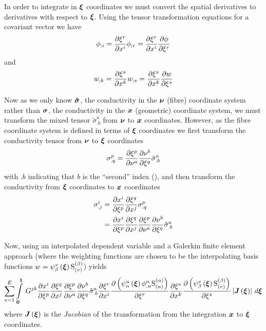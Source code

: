 In order to integrate in $\vect{\xi}$ coordinates we must convert the spatial
derivatives to derivatives with respect to $\vect{\xi}$. Using the tensor
transformation equations for a covariant vector we have
\begin{equation}  
   {\phi}_{;i} = \dfrac{\partial \xi^{r}}{\partial x^{i}}  {\phi}_{;r} = \dfrac{\partial \xi^{r}}{\partial x^{i}}  \dfrac{\partial \phi}{\partial \xi^{r}} 
\end{equation}
and 
\begin{equation}
   {w}_{;k} = \dfrac{\partial \xi^{s}}{\partial x^{k}}  {w}_{;s} = \dfrac{\partial \xi^{s}}{\partial x^{k}}  \dfrac{\partial w}{\partial \xi^{s}} 
\end{equation}

Now as we only know $\boldsymbol{\tilde{\sigma}}$, the conductivity in the
$\vect{\nu}$ (fibre) coordinate system rather than $\boldsymbol{\sigma}$, the
conductivity in the $\vect{x}$ (geometric) coordinate system, we must transform the mixed
tensor ${\tilde{\sigma}}^{a}_{.b}$ from $\vect{\nu}$ to $\vect{x}$ coordinates. However, as the
fibre coordinate system is defined in terms of $\vect{\xi}$ coordinates we
first transform the conductivity tensor from $\vect{\nu}$ to $\vect{\xi}$
coordinates \ie
\begin{equation}
  \sigma^{p}_{.q}= \dfrac{\partial \xi^{p}}{\partial \nu^{a}}  \dfrac{\partial \nu^{b}}{\partial \xi^{q}} {\tilde{\sigma}}^{a}_{.b}
\end{equation}
with $.b$ indicating that $b$ is the ``second'' index (),
and then transform the conductivity from $\vect{\xi}$ coordinates to
$\vect{x}$ coordinates \ie
\begin{equation}
  \begin{split}
    \sigma^{i}_{.j} &=  \dfrac{\partial x^{i}}{\partial \xi^{p}}  \dfrac{\partial \xi^{q}}{\partial x^{j}} {\sigma}^{p}_{.q} \\
    &=  \dfrac{\partial x^{i}}{\partial \xi^{p}}  \dfrac{\partial \xi^{q}}{\partial x^{j}}  \dfrac{\partial \xi^{p}}{\partial \nu^{a}}  \dfrac{\partial \nu^{b}}{\partial \xi^{q}} {\tilde{\sigma}}^{a}_{.b}
  \end{split}
\end{equation}

Now, using an interpolated dependent variable and a Galerkin finite element
approach (where the weighting functions are chosen to be the interpolating
basis functions \ie $w=\gbfn{\beta}{v}{\vect{\xi}}\gsf{(\beta)}{(v)}$) yields
\begin{equation}
  \dsum_{e=1}^{E}\gint{\vect{0}}{\vect{1}}{G^{jk}\delby{x^{i}}{\xi^{p}}
    \delby{\xi^{q}}{x^{j}}\delby{\xi^{p}} {\nu^{a}}
    \delby{\nu^{b}}{\xi^{q}}{\tilde{\sigma}}^{a}_{.b}\delby{\xi^{r}}{x^{i}}
    \delby{\pbrac{\gbfn{\alpha}{u}{\vect{\xi}}\nodedof{\phi}{\alpha}{u}\gsf{(\alpha)}{(u)}}}{\xi^{r}}
    \delby{\xi^{s}}{x^{k}}\delby{\pbrac{\gbfn{\beta}{v}{\vect{\xi}}\gsf{(\beta)}{(v)}}}{\xi^{s}}
    \abs{\fnof{\matr{J}}{\vect{\xi}}}}{\vect{\xi}}
\end{equation}
where $\fnof{\matr{J}}{\vect{\xi}}$ is the \emph{Jacobian} of the
transformation from the integration $\vect{x}$ to $\vect{\xi}$ coordinates.


